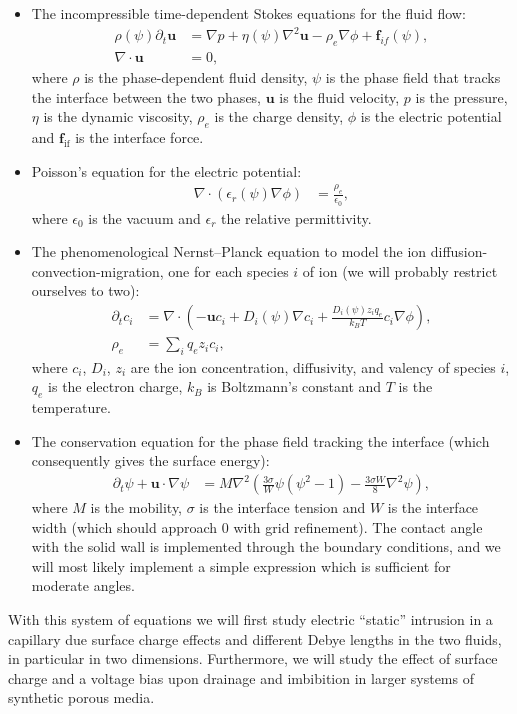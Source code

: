 \documentclass[a4paper,10pt]{article}
\numberwithin{equation}{section}
\numberwithin{figure}{section}
\renewcommand{\v}[1]{\mathbf{#1}}
\newcommand{\intf}{\textrm{if}}
\begin{document}
\begin{itemize} 
\item The incompressible time-dependent Stokes equations for the fluid flow:
  \begin{align}
    \rho(\psi) \partial_t \mathbf{u}  &= \nabla p +\eta(\psi) \nabla^2 \mathbf{u} -  \rho_e  \nabla \phi + \mathbf{f}_{if}(\psi),  \\  
    \nabla \cdot\mathbf{u} &= 0,
  \end{align}
  where $\rho$ is the phase-dependent fluid density, $\psi$ is the phase field that tracks the interface between the two phases, $\v u$ is the fluid velocity, $p$ is the pressure, $\eta$ is the dynamic viscosity, $\rho_e$ is the charge density, $\phi$ is the electric potential and $\v f_{\intf}$ is the interface force.
\item Poisson's equation for the electric potential: 
  \begin{align}
    \nabla\cdot\left(\epsilon_r(\psi)\nabla\phi\right) &= \frac{\rho_e}{\epsilon_0 },
  \end{align}
  where $\epsilon_0$ is the vacuum  and $\epsilon_r$ the relative permittivity.
\item The phenomenological Nernst--Planck equation to model the ion diffusion-convection-migration, one for each species $i$ of ion (we will probably restrict ourselves to two):
  \begin{align}
    \partial_t c_i  &=  \nabla  \cdot  \left( - \mathbf{u} c_i  + D_i(\psi) \nabla c_i  +   \frac{D_i(\psi) z_i q_e}{k_B T} c_i \nabla \phi \right), \\
\rho_e &= \sum_i q_e z_i c_i, 
  \end{align}
  where $c_i$, $D_i$, $z_i$ are the ion concentration, diffusivity, and valency of species $i$, $q_e$ is the electron charge, $k_B$ is Boltzmann's constant and $T$ is the temperature.
\item The conservation equation for the phase field tracking the interface (which consequently gives the surface energy):
  \begin{align}
    \partial_t \psi + \mathbf{u}\cdot\nabla\psi &= M\nabla^2\left(\frac{3 \sigma }{W} \psi \left(\psi^2 -1\right) - \frac{3 \sigma W}{8}\nabla^2 \psi\right),
  \end{align}
  where $M$ is the mobility, $\sigma$ is the interface tension and $W$ is the interface width (which should approach 0 with grid refinement).
  The contact angle with the solid wall is implemented through the boundary conditions, and we will most likely implement a simple expression which is sufficient for moderate angles.
\end{itemize}
With this system of equations we will first study electric ``static'' intrusion in a capillary due surface charge effects and different Debye lengths in the two fluids, in particular in two dimensions.
Furthermore, we will study the effect of surface charge and a voltage bias upon drainage and imbibition in larger systems of synthetic porous media.
\end{document}
